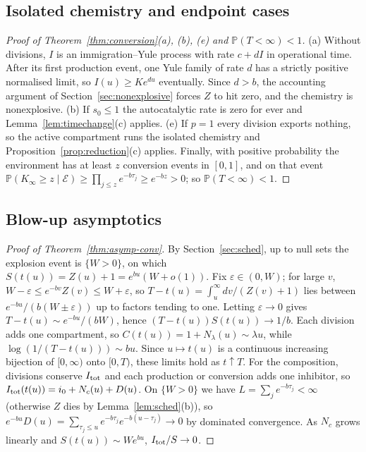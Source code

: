 \documentclass[11pt,a4paper]{article}
\numberwithin{equation}{section}
\theoremstyle{definition}\newtheorem{definition}[theorem]{Definition}
\theoremstyle{remark}\newtheorem{remark}[theorem]{Remark}\newtheorem{example}[theorem]{Example}
\renewcommand{\P}{\mathbb P}
\begin{document}
\subsection{Isolated chemistry and endpoint cases}\label{sec:endpoints}
\begin{proof}[Proof of Theorem~\ref{thm:conversion}(a), (b), (e) and $\P(T<\infty)<1$]
(a) Without divisions, $I$ is an immigration--Yule process with rate $c+dI$ in operational time. After its first production event, one Yule family of rate $d$ has a strictly positive normalised limit, so $I(u)\ge Ke^{du}$ eventually. Since $d>b$, the accounting argument of Section~\ref{sec:nonexplosive} forces $Z$ to hit zero, and the chemistry is nonexplosive. (b) If $s_0\le1$ the autocatalytic rate is zero for ever and Lemma~\ref{lem:timechange}(c) applies. (e) If $p=1$ every division exports nothing, so the active compartment runs the isolated chemistry and Proposition~\ref{prop:reduction}(c) applies. Finally, with positive probability the environment has at least $z$ conversion events in $[0,1]$, and on that event $\P(K_\infty\ge z\mid\mathcal E)\ge\prod_{j\le z}e^{-b\tau_j}\ge e^{-bz}>0$; so $\P(T<\infty)<1$.
\end{proof}

\subsection{Blow-up asymptotics}\label{sec:asymp}
\begin{proof}[Proof of Theorem~\ref{thm:asymp-conv}]
By Section~\ref{sec:sched}, up to null sets the explosion event is $\{W>0\}$, on which $S(t(u))=Z(u)+1=e^{bu}(W+o(1))$. Fix $\varepsilon\in(0,W)$; for large $v$, $W-\varepsilon\le e^{-bv}Z(v)\le W+\varepsilon$, so $T-t(u)=\int_u^\infty dv/(Z(v)+1)$ lies between $e^{-bu}/(b(W\pm\varepsilon))$ up to factors tending to one. Letting $\varepsilon\to0$ gives $T-t(u)\sim e^{-bu}/(bW)$, hence $(T-t(u))S(t(u))\to1/b$. Each division adds one compartment, so $C(t(u))=1+N_\lambda(u)\sim\lambda u$, while $\log(1/(T-t(u)))\sim bu$. Since $u\mapsto t(u)$ is a continuous increasing bijection of $[0,\infty)$ onto $[0,T)$, these limits hold as $t\uparrow T$. For the composition, divisions conserve $I_{\rm tot}$ and each production or conversion adds one inhibitor, so $I_{\rm tot}(t(u))=i_0+N_c(u)+D(u)$. On $\{W>0\}$ we have $L=\sum_je^{-b\tau_j}<\infty$ (otherwise $Z$ dies by Lemma~\ref{lem:sched}(b)), so $e^{-bu}D(u)=\sum_{\tau_j\le u}e^{-b\tau_j}e^{-b(u-\tau_j)}\to0$ by dominated convergence. As $N_c$ grows linearly and $S(t(u))\sim We^{bu}$, $I_{\rm tot}/S\to0$.
\end{proof}
\end{document}

